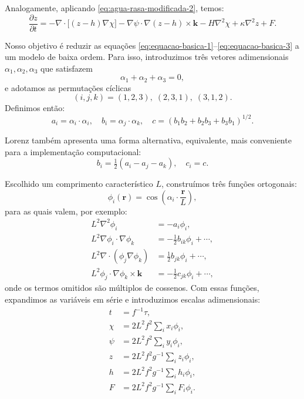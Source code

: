 Analogamente, aplicando \eqref{eq:agua-rasa-modificada-2}, temos:
\begin{equation}
	\frac{\partial z}{\partial t} 
	= -\nabla \cdot \big[(z - h)\nabla \chi\big] 
	- \nabla \psi \cdot \nabla(z - h) \times \mathbf{k} 
	- H\nabla^2\chi + \kappa\nabla^2z + F. 
	\label{eq:equacao-basica-3}
\end{equation}

Nosso objetivo é reduzir as equações \eqref{eq:equacao-basica-1}–\eqref{eq:equacao-basica-3} a um modelo de baixa ordem. Para isso, introduzimos três vetores adimensionais $\alpha_1, \alpha_2, \alpha_3$ que satisfazem
\begin{equation*}
	\alpha_1 + \alpha_2 + \alpha_3 = 0,
\end{equation*}
e adotamos as permutações cíclicas
\begin{equation*}
	(i,j,k) = (1,2,3),\; (2,3,1),\; (3,1,2).
\end{equation*}
Definimos então:
\begin{equation*}
	a_i = \alpha_i \cdot \alpha_i, 
	\quad b_i = \alpha_j \cdot \alpha_k, 
	\quad c = (b_1b_2+b_2b_3+b_3b_1)^{1/2}.
\end{equation*}

Lorenz também apresenta uma forma alternativa, equivalente, mais conveniente para a implementação computacional:
\begin{equation*}
	b_i = \tfrac{1}{2}(a_i - a_j - a_k), 
	\quad c_i = c.
\end{equation*}

Escolhido um comprimento característico $L$, construímos três funções ortogonais:
\begin{equation*}
	\phi_i(\mathbf{r}) = \cos\!\left(\alpha_i \cdot \frac{\mathbf{r}}{L}\right),
\end{equation*}
para as quais valem, por exemplo:
\begin{align*}
	L^2\nabla^2\phi_i                              & = -a_i\phi_i,                         \\
	L^2\nabla\phi_i \cdot \nabla\phi_k             & = -\tfrac{1}{2}b_{ik}\phi_i + \cdots, \\
	L^2\nabla \cdot (\phi_j\nabla\phi_k)           & = \tfrac{1}{2}b_{jk}\phi_i + \cdots,  \\
	L^2\phi_j \cdot \nabla\phi_k \times \mathbf{k} & = -\tfrac{1}{2}c_{jk}\phi_i + \cdots, 
\end{align*}
onde os termos omitidos são múltiplos de cossenos. Com essas funções, expandimos as variáveis em série e introduzimos escalas adimensionais:
\begin{align*}
	t    & = f^{-1}\tau,               \\
	\chi & = 2L^2f^2 \sum_i x_i\phi_i,                                              \\
	\psi & = 2L^2f^2 \sum_i y_i\phi_i,                                              \\
	z    & = 2L^2f^2g^{-1} \sum_i z_i\phi_i,                                        \\
	h    & = 2L^2f^2g^{-1} \sum_i h_i\phi_i,                                        \\
	F    & = 2L^2f^2g^{-1} \sum_i F_i\phi_i.
\end{align*}

